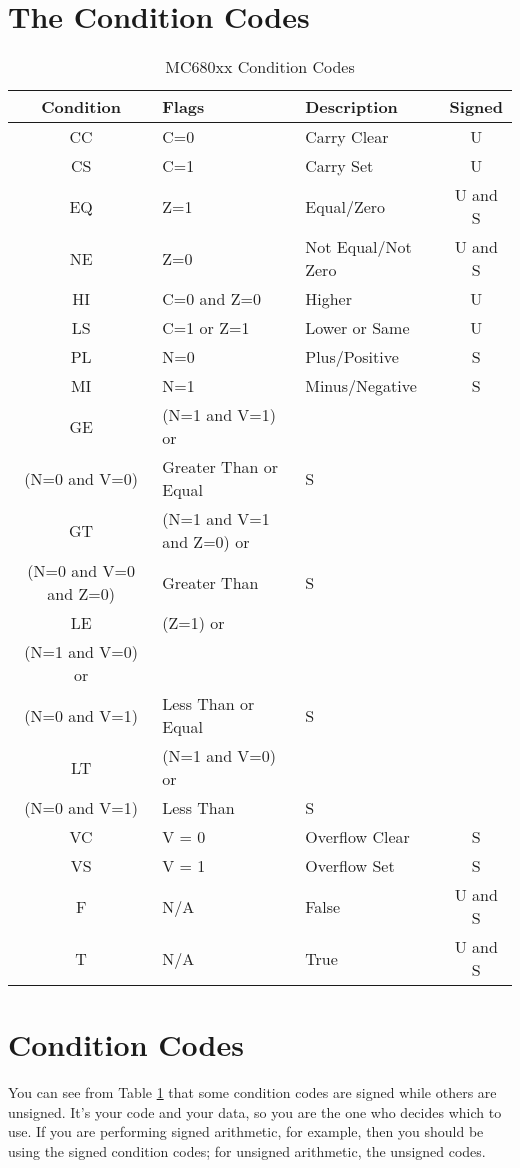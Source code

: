 \section{The Condition Codes}

\begin{table}[!h]
\begin{centering}
\begin{tabular}{|c|>{\centering}p{}|>{\centering}p{}|c|}
\hline 
\textbf{Condition} & \textbf{Flags} & \textbf{Description} & \textbf{Signed}\tabularnewline
\hline 
\hline 
CC & C=0 & Carry Clear & U\tabularnewline
\hline 
CS & C=1 & Carry Set & U\tabularnewline
\hline 
EQ & Z=1 & Equal/Zero & U and S\tabularnewline
\hline 
NE & Z=0 & Not Equal/Not Zero & U and S\tabularnewline
\hline 
HI & C=0 and Z=0 & Higher & U\tabularnewline
\hline 
LS & C=1 or Z=1 & Lower or Same & U\tabularnewline
\hline 
PL & N=0 & Plus/Positive & S\tabularnewline
\hline 
MI & N=1 & Minus/Negative & S\tabularnewline
\hline 
GE & (N=1 and V=1) or\\
(N=0 and V=0) & Greater Than or Equal & S\tabularnewline
\hline 
GT & (N=1 and V=1 and Z=0) or \\
(N=0 and V=0 and Z=0) & Greater Than & S\tabularnewline
\hline 
LE & (Z=1) or \\
(N=1 and V=0) or \\
(N=0 and V=1) & Less Than or Equal & S\tabularnewline
\hline 
LT & (N=1 and V=0) or \\
(N=0 and V=1) & Less Than & S\tabularnewline
\hline 
VC & V = 0 & Overflow Clear & S \tabularnewline
\hline
VS & V = 1 & Overflow Set & S \tabularnewline
\hline
F & N/A & False & U and S \tabularnewline
\hline
T & N/A & True & U and S \tabularnewline
\hline
\end{tabular}
\par\end{centering}
\caption{MC680xx Condition Codes\label{tab:MC680xx-Condition-Codes}}
\end{table}


\section{Condition Codes}

You can see from Table \ref{tab:MC680xx-Condition-Codes} that some condition codes are signed while others are unsigned. It's your  code and your data, so you are the one who decides which to use. If you are performing signed arithmetic, for example, then you should be using the signed condition codes; for unsigned arithmetic, the unsigned codes. 

